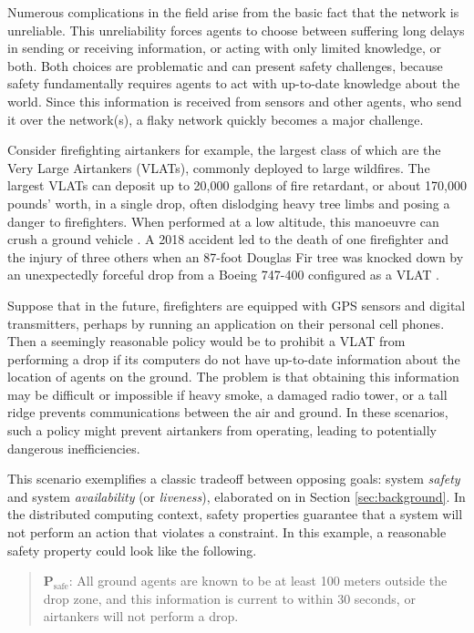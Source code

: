 \documentclass[]             %
{NASA}                       %
\theoremstyle{definition}
\begin{document}
Numerous complications in the field arise from the basic fact that the
network is unreliable. This unreliability forces agents to choose
between suffering long delays in sending or receiving information, or
acting with only limited knowledge, or both. Both choices are
problematic and can present safety challenges, because safety
fundamentally requires agents to act with up-to-date knowledge about
the world. Since this information is received from sensors and other
agents, who send it over the network(s), a flaky network quickly
becomes a major challenge.

Consider firefighting airtankers for example, the largest class of which
are the Very Large Airtankers (VLATs), commonly deployed to large wildfires.
The largest VLATs can deposit up to 20,000 gallons of fire retardant, or
about 170,000 pounds' worth, in a single drop, often dislodging heavy
tree limbs and posing a danger to firefighters. When performed at a low
altitude, this manoeuvre can crush a ground vehicle \cite{2019:stickney}.
A 2018 accident led to the death of one firefighter and the injury of
three others when an 87-foot Douglas Fir tree was knocked down by an unexpectedly forceful drop from a Boeing 747-400 configured as a VLAT \cite{2018:calfire}.

Suppose that in the future, firefighters are equipped with GPS sensors
and digital transmitters, perhaps by running an application on their personal cell phones. Then a seemingly reasonable policy would be to
prohibit a VLAT from performing a drop if its computers do not have
up-to-date information about the location of agents on the ground. The
problem is that obtaining this information may be difficult or
impossible if heavy smoke, a damaged radio tower, or a tall ridge
prevents communications between the air and ground. In these scenarios,
such a policy might prevent airtankers from operating, leading to
potentially dangerous inefficiencies.

This scenario exemplifies a classic tradeoff between opposing goals:
system \emph{safety} and system \emph{availability} (or
\emph{liveness}), elaborated on in Section \ref{sec:background}. In the
distributed computing context, safety properties guarantee that a system
will not perform an action that violates a constraint. In this example,
a reasonable safety property could look like the following.

\begin{quote}
    $\textbf{P}_\textrm{safe}$: All ground agents are
known to be at least 100 meters outside the drop zone, and this
information is current to within 30 seconds, or airtankers will not perform a
drop.
\end{quote}
\end{document}
